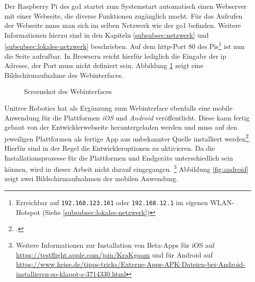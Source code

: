 
Der Raspberry Pi des \gls{go1} startet zum Systemstart automatisch einen Webserver mit einer Webseite, die diverse Funktionen
zugänglich macht.
Für das Aufrufen der Webseite muss man sich im selben Netzwerk wie der \gls{go1} befinden.
Weitere Informationen hierzu sind in den Kapiteln \ref{subsubsec:netzwerk} und \ref{subsubsec:lokales-netzwerk} beschrieben.
Auf dem \gls{http}-Port \num{80} des Pis\footnote{Erreichbar auf \texttt{192.168.123.161} oder \texttt{192.168.12.1} im eigenen WLAN-Hotspot (Siehe \ref{subsubsec:lokales-netzwerk})}
ist nun die Seite aufrufbar.
In Browsern reicht hierfür lediglich die Eingabe der \gls{ip} Adresse, der Port muss nicht definiert sein.
Abbildung \ref{fig:website} zeigt eine Bildschirmaufnahme des Webinterfaces.

\begin{figure}[h]
    \caption{Screenshot des Webinterfaces}\label{fig:website}
\end{figure}


Unitree Robotics hat als Ergänzung zum Webinterface ebenfalls eine mobile Anwendung für die Plattformen \emph{iOS} und
\emph{Android} veröffentlicht.
Diese kann fertig gebaut von der Entwicklerwebseite heruntergeladen werden und muss auf den jeweiligen Plattformen als
fertige App aus unbekannter Quelle installiert werden\footcite{unitree_app_download}.
Hierfür sind in der Regel die Entwickleroptionen zu aktivieren.
Da die Installationsprozesse für die Plattformen und Endgeräte unterschiedlich sein können, wird in dieser Arbeit nicht
darauf eingegangen.
\footnote{Weitere Informationen zur Installation von Beta-Apps für iOS auf \url{https://testflight.apple.com/join/KraKgqam}
und für Android auf \url{https://www.heise.de/tipps-tricks/Externe-Apps-APK-Dateien-bei-Android-installieren-so-klappt-s-3714330.html}}
Abbildung \ref{fig:android} zeigt zwei Bildschirmaufnahmen der mobilen Anwendung.

